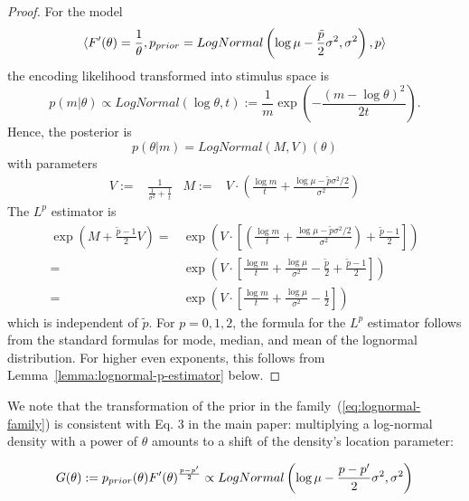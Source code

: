 \begin{proof}
    For the model
    \begin{equation}
        \langle F'(\theta) = \frac{1}{\theta}, p_{prior} = LogNormal\left(\log \mu - \frac{\tilde{p}}{2}\sigma^2, \sigma^2\right), {p}\rangle
    \end{equation}
    the encoding likelihood transformed into stimulus space is
    \begin{equation}
        p(m|\theta) \propto LogNormal(\log \theta, t) := \frac{1}{m} \exp(-\frac{(m - \log \theta)^2}{2t}).
    \end{equation}
    Hence, the posterior is
\begin{equation}
    p(\theta|m) = LogNormal(M, V)(\theta)
\end{equation}
with parameters
\begin{align*} 
V := &\frac{1}{\frac{1}{\sigma^2}+\frac{1}{t}} &
    M := &V \cdot \left(\frac{\log m}{t} + \frac{\log\mu - \tilde{p}\sigma^2/2}{\sigma^2}\right)
\end{align*}
The $L^{{p}}$ estimator is 
    \begin{align*}
        \exp(M + \frac{\tilde{p}-1}{2} V) =& \exp(V \cdot \left[\left(\frac{\log m}{t} + \frac{\log\mu - \tilde{p}\sigma^2/2}{\sigma^2}\right) + \frac{\tilde{p}-1}{2}\right]) \\
        =& \exp(V \cdot \left[\frac{\log m}{t} + \frac{\log\mu }{\sigma^2} - \frac{\tilde{p}}{2}  + \frac{\tilde{p}-1}{2}\right]) \\
        =& \exp(V \cdot \left[\frac{\log m}{t} + \frac{\log\mu }{\sigma^2}   - \frac{1}{2}\right])
    \end{align*}
    which is independent of $\tilde{p}$.
    For $p=0,1,2$, the formula for the $L^p$ estimator follows from the standard formulas for mode, median, and mean of the lognormal distribution.
    For higher even exponents, this follows from Lemma~\ref{lemma:lognormal-p-estimator} below.
    
    
\end{proof}
We note that the transformation of the prior in the family~(\ref{eq:lognormal-family}) is consistent with Eq. 3 in the main paper: multiplying a log-normal density with a power of $\theta$ amounts to a shift of the density's location parameter:
\begin{lemma}
\begin{align*}
  G(\theta) :=  p_{prior}(\theta) F'(\theta)^{\frac{p-p'}{2}} \propto LogNormal\left(\log\mu - \frac{p-p'}{2}\sigma^2, \sigma^2\right)
\end{align*}
\end{lemma}
